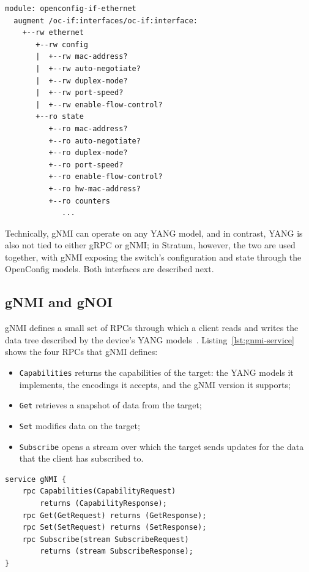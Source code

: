 \begin{lstlisting}[language={},caption={The Ethernet augmentation of the OpenConfig interfaces model (abridged). Adapted from \cite{systemsapproach}.},label={lst:oc-ethernet}]
module: openconfig-if-ethernet
  augment /oc-if:interfaces/oc-if:interface:
    +--rw ethernet
       +--rw config
       |  +--rw mac-address?
       |  +--rw auto-negotiate?
       |  +--rw duplex-mode?
       |  +--rw port-speed?
       |  +--rw enable-flow-control?
       +--ro state
          +--ro mac-address?
          +--ro auto-negotiate?
          +--ro duplex-mode?
          +--ro port-speed?
          +--ro enable-flow-control?
          +--ro hw-mac-address?
          +--ro counters
             ...
\end{lstlisting}

Technically, gNMI can operate on any YANG model, and in contrast, YANG is also not tied to either gRPC or gNMI; in Stratum, however, the two are used together, with gNMI exposing the switch's configuration and state through the OpenConfig models. Both interfaces are described next.

\subsection{gNMI and gNOI}\label{sec:gnmi-gnoi}
gNMI defines a small set of RPCs through which a client reads and writes the data tree described by the device's YANG models~\cite{gnmi}. Listing~\ref{lst:gnmi-service} shows the four RPCs that gNMI defines:
\begin{itemize}
    \item \texttt{Capabilities} returns the capabilities of the target: the YANG models it implements, the encodings it accepts, and the gNMI version it supports;
    \item \texttt{Get} retrieves a snapshot of data from the target;
    \item \texttt{Set} modifies data on the target;
    \item \texttt{Subscribe} opens a stream over which the target sends updates for the data that the client has subscribed to.
\end{itemize}

\begin{lstlisting}[language={},caption={The RPCs defined by the gNMI service.},label={lst:gnmi-service}]
service gNMI {
    rpc Capabilities(CapabilityRequest)
        returns (CapabilityResponse);
    rpc Get(GetRequest) returns (GetResponse);
    rpc Set(SetRequest) returns (SetResponse);
    rpc Subscribe(stream SubscribeRequest)
        returns (stream SubscribeResponse);
}
\end{lstlisting}

